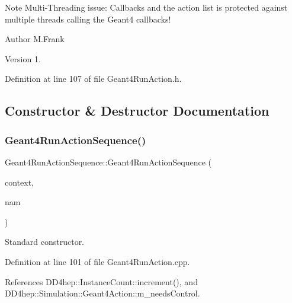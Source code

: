 Note Multi-\/\+Threading issue\+: Callbacks and the action list is protected against multiple threads calling the Geant4 callbacks!

\begin{DoxyAuthor}{Author}
M.\+Frank 
\end{DoxyAuthor}
\begin{DoxyVersion}{Version}
1. 
\end{DoxyVersion}


Definition at line 107 of file Geant4\+Run\+Action.\+h.



\subsection{Constructor \& Destructor Documentation}
\hypertarget{class_d_d4hep_1_1_simulation_1_1_geant4_run_action_sequence_adbd525bcacdb9655df38196c1ce6a1a3}{}\label{class_d_d4hep_1_1_simulation_1_1_geant4_run_action_sequence_adbd525bcacdb9655df38196c1ce6a1a3} 
\subsubsection{\texorpdfstring{Geant4\+Run\+Action\+Sequence()}{Geant4RunActionSequence()}}
{\footnotesize\ttfamily Geant4\+Run\+Action\+Sequence\+::\+Geant4\+Run\+Action\+Sequence (\begin{DoxyParamCaption}\item[{\hyperlink{class_d_d4hep_1_1_simulation_1_1_geant4_context}{Geant4\+Context} $\ast$}]{context,  }\item[{const std\+::string \&}]{nam }\end{DoxyParamCaption})}



Standard constructor. 



Definition at line 101 of file Geant4\+Run\+Action.\+cpp.



References D\+D4hep\+::\+Instance\+Count\+::increment(), and D\+D4hep\+::\+Simulation\+::\+Geant4\+Action\+::m\+\_\+needs\+Control.

